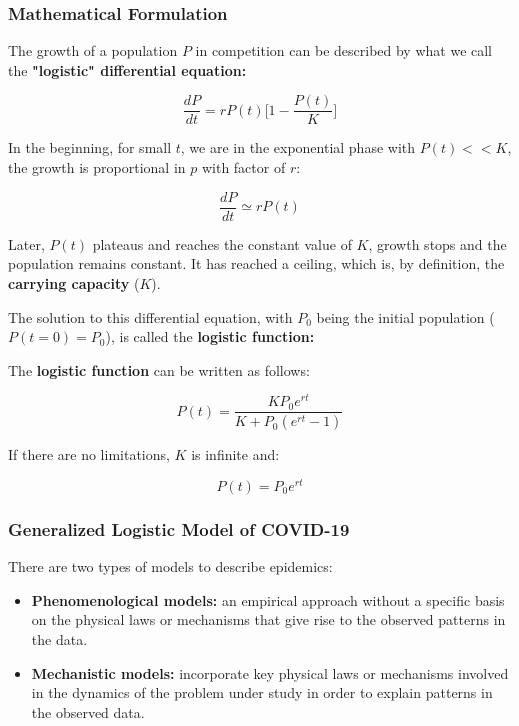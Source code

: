 \documentclass[a4paper]{extarticle}
\begin{document}
\subsubsection{Mathematical Formulation}

The growth of a population \(P\) in competition can be described by what we call the \textbf{"logistic" differential equation:}

\[
    \frac{dP}{dt} = rP(t) \Big\lbrack 1 - \frac{P(t)}{K} \Big\rbrack
\]

In the beginning, for small \(t\), we are in the exponential phase with \(P(t) << K\), the growth is proportional in \(p\) with factor of \(r\):

\[
    \frac{dP}{dt} \simeq r P(t)
\]

Later, \(P(t)\) plateaus and reaches the constant value of \(K\), growth stops and the population remains constant. It has reached a ceiling, which is, by definition, the \textbf{carrying capacity} (\(K\)).

The solution to this differential equation, with \(P_0\) being the initial population (\(P(t = 0) = P_0\)), is called the \textbf{logistic function:}

\begin{tbox}
    The \textbf{logistic function} can be written as follows:

    \[
        P(t) = \frac{KP_0e^{rt}}{K + P_0(e^{rt} - 1)}
    \]
\end{tbox}

If there are no limitations, \(K\) is infinite and:

\[
    P(t) = P_0e^{rt}
\]

\subsubsection{Generalized Logistic Model of COVID-19}

There are two types of models to describe epidemics:

\begin{itemize}
    \item \textbf{Phenomenological models:} an empirical approach without a specific basis on the physical laws or mechanisms that give rise to the observed patterns in the data.
    \item \textbf{Mechanistic models:} incorporate key physical laws or mechanisms involved in the dynamics of the problem under study in order to explain patterns in the observed data.
\end{itemize}
\end{document}
